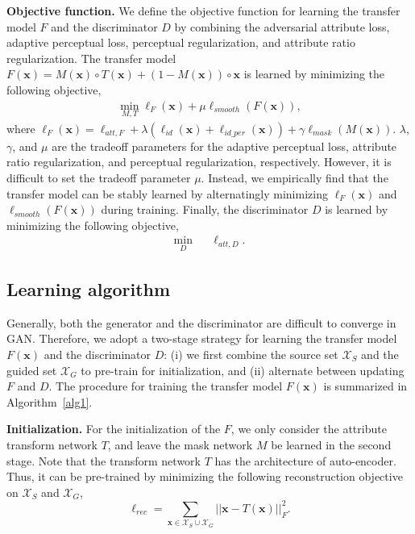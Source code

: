 \documentclass[journal]{IEEEtran}
\begin{document}
\textbf{Objective function.}\quad
We define the objective function for learning the transfer model $F$ and the discriminator $D$ by combining the adversarial attribute loss, adaptive perceptual loss, perceptual regularization, and attribute ratio regularization.
The transfer model $F(\mathbf{x}) = M(\mathbf{x}) \circ T(\mathbf{x})+(1-M(\mathbf{x})) \circ \mathbf{x}$ is learned by minimizing the following objective,
\begin{eqnarray}\label{eqn:objectiveF}
\min\limits_{M, T} \ell_{F}(\mathbf{x}) + \mu \ell_{smooth}(F(\mathbf{x})),
\end{eqnarray}
where $\ell_{F}(\mathbf{x}) = \ell_{att,F} + \lambda(\ell_{id}(\mathbf{x})+\ell_{id\_per}(\mathbf{x})) + \gamma \ell_{mask}(M(\mathbf{x}))$.
$\lambda$, $\gamma$, and $\mu$ are the tradeoff parameters for the adaptive perceptual loss, attribute ratio regularization, and perceptual regularization, respectively.
However, it is difficult to set the tradeoff parameter $\mu$.
Instead, we empirically find that the transfer model can be stably learned by alternatingly minimizing $\ell_{F}(\mathbf{x})$ and $\ell_{smooth}(F(\mathbf{x}))$ during training.
Finally, the discriminator $D$ is learned by minimizing the following objective,
\begin{eqnarray}\label{eq7}
\min\limits_{D} \!\!\!&&\!\!\! \ell_{att,D}.
\end{eqnarray}







\subsection{Learning algorithm}\label{sec:learning}

Generally, both the generator and the discriminator are difficult to converge in GAN.
Therefore, we adopt a two-stage strategy for learning the transfer model $F(\mathbf{x})$ and the discriminator $D$:
(i) we first combine the source set $\mathcal{X}_S$ and the guided set $\mathcal{X}_G$ to pre-train for initialization, and (ii) alternate between updating $F$ and $D$.
The procedure for training the transfer model $F(\mathbf{x})$ is summarized in Algorithm~\ref{alg1}.






\textbf{Initialization.}\quad
For the initialization of the $F$, we only consider the attribute transform network $T$, and leave the mask network $M$ be learned in the second stage.
Note that the transform network $T$ has the architecture of auto-encoder.
Thus, it can be pre-trained by minimizing the following reconstruction objective on $\mathcal{X}_S$ and $\mathcal{X}_G$,
\begin{equation}\label{eq8}
  \ell_{rec} = \sum_{\mathbf{x} \in \mathcal{X}_S \cup \mathcal{X}_G}||\mathbf{x} - T(\mathbf{x})||_F^2 .
\end{equation}
\end{document}
